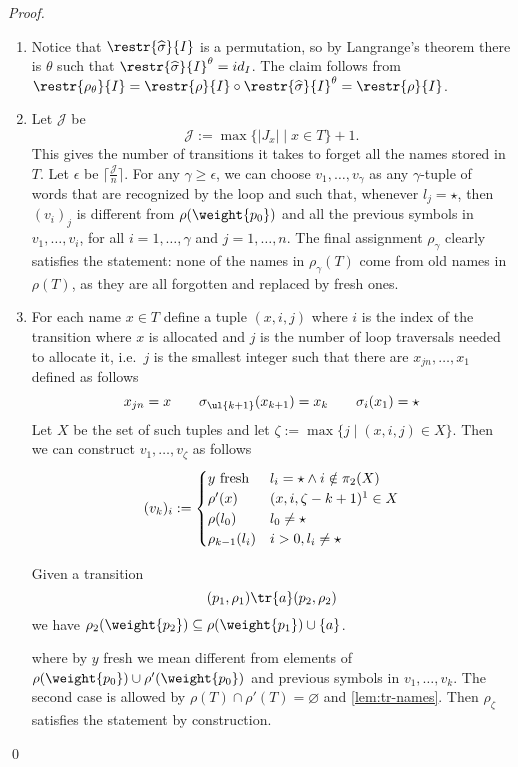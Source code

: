 \begin{proof}\hfill
\begin{enumerate}


\item Notice that $\restr{\widehat{\sigma}}{I}$ is a permutation, so by Langrange's theorem there is $\theta$ such that $\restr{\widehat{\sigma}}{I}^\theta = id_I$. The claim follows from $\restr{ \rho_\theta }{ I } =\restr{ \rho }{I} \circ \restr{ \widehat{\sigma}}{I}^{\theta} = \restr{ \rho }{I}$.


\item
Let $\mathcal{J}$ be
\[
	\mathcal{J} := \max \{ |J_x|\mid x \in T \} + 1 .
\]
This gives the number of transitions it takes to forget all the names stored in $T$. Let $\epsilon$ be $\lceil \frac{\mathcal{J}}{n} \rceil$. For any $\gamma \geq \epsilon$, we can choose $v_1,\dots,v_\gamma$ as any $\gamma$-tuple of words that are recognized by the loop and such that, whenever $l_j = \star$, then $(v_i)_j$ is different from $\rho(\weight{p_0})$ and all the previous symbols in $v_1,\dots,v_i$, for all $i=1,\dots,\gamma$ and $j=1,\dots,n$. The final assignment $\rho_\gamma$ clearly satisfies the statement: none of the names in $\rho_\gamma(T)$ come from old names in $\rho(T)$, as they are all forgotten and replaced by fresh ones.

\item For each name $x \in T$ define a tuple $(x,i,j)$ where $i$ is the index of the transition where $x$ is allocated and $j$ is the number of loop traversals needed to allocate it, i.e.\ $j$ is the smallest integer such that there are $x_{jn},\dots,x_1$ defined as follows
\[
	x_{jn} = x \qquad \sigma_\ul{k+1}(x_{k+1}) = x_k \qquad \sigma_i(x_1) = \star
\]
Let $X$ be the set of such tuples and let $\zeta := \max \{ j \mid (x,i,j) \in X \}$. Then we can construct $v_1,\dots,v_\zeta$ as follows
\[
	(v_k)_i :=
	\begin{cases}
		\text{$y$ fresh} & l_i = \star \land i \notin \pi_2(X) \\
		\rho'(x) & (x,i,\zeta - k + 1)\footnotemark \in X
		 \\
		\rho(l_0) & l_0 \neq \star \\
		\rho_{k-1}(l_i) & i > 0 , l_i \neq \star
	\end{cases}
\]

\begin{lemma}
\label{lem:tr-names}
Given a transition
\[
	(p_1,\rho_1) \tr{a} (p_2,\rho_2) 
\]
we have $\rho_2(\weight{p_2}) \subseteq \rho(\weight{p_1}) \cup \{ a \}$.
\end{lemma}
where by $y$ fresh we mean different from elements of $\rho(\weight{p_0}) \cup \rho'(\weight{p_0})$ and previous symbols in $v_1,\dots,v_{k}$.
The second case is allowed by $\rho(T) \cap \rho'(T) = \varnothing$ and \cref{lem:tr-names}.
Then $\rho_\zeta$ satisfies the statement by construction.

\end{enumerate}
\qed
\end{proof}


